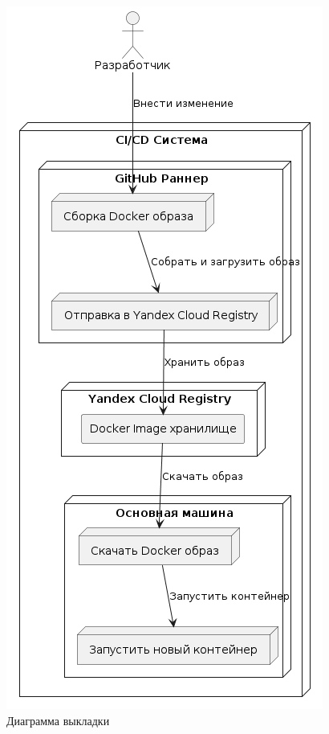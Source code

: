 \begin{figure}[htb]
	\centering
	\includegraphics[width=.6\textwidth]{images/cicd.png}
	\parskip=6pt
	\caption{Диаграмма выкладки}
	\label{fig:cicd}
\end{figure}

